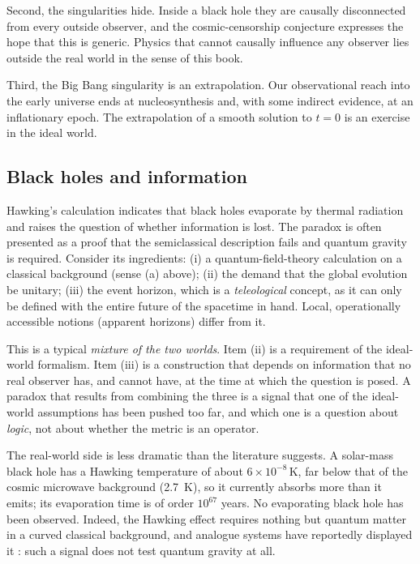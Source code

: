 Second, the singularities hide. Inside a black hole they are causally
disconnected from every outside observer, and the cosmic-censorship
conjecture expresses the hope that this is generic. Physics that cannot
causally influence any observer lies outside the real world in the sense of
this book.

Third, the Big Bang singularity is an extrapolation. Our observational
reach into the early universe ends at nucleosynthesis and, with some
indirect evidence, at an inflationary epoch. The extrapolation of a smooth
solution to $t=0$ is an exercise in the ideal world.

\subsection{Black holes and information}

Hawking's calculation \cite{qg:hawking} indicates that black holes
evaporate by thermal radiation and raises the question of whether
information is lost. The paradox is often presented as a proof that the
semiclassical description fails and quantum gravity is required. Consider
its ingredients: (i) a quantum-field-theory calculation on a classical
background (sense (a) above); (ii) the demand that the global evolution
be unitary; (iii) the event horizon, which is a \emph{teleological}
concept, as it can only be defined with the entire future of the
spacetime in hand. Local, operationally accessible notions (apparent
horizons) differ from it.

This is a typical \emph{mixture of the two worlds}. Item (ii) is a
requirement of the ideal-world formalism. Item (iii) is a construction
that depends on information that no real observer has, and cannot
have, at the time at which the question is posed. A paradox that
results from combining the three is a signal that one of the ideal-world
assumptions has been pushed too far, and which one is a question about
\emph{logic}, not about whether the metric is an operator.

The real-world side is less dramatic than the literature suggests. A
solar-mass black hole has a Hawking temperature of about
$6\times10^{-8}\,\mathrm{K}$, far below that of the cosmic microwave
background (2.7~K), so it currently absorbs more than it emits; its
evaporation time is of order $10^{67}$ years. No evaporating black hole
has been observed. Indeed, the Hawking effect requires nothing but
quantum matter in a curved classical background, and analogue systems have
reportedly displayed it \cite{qg:steinhauer}: such a signal does not test
quantum gravity at all.

